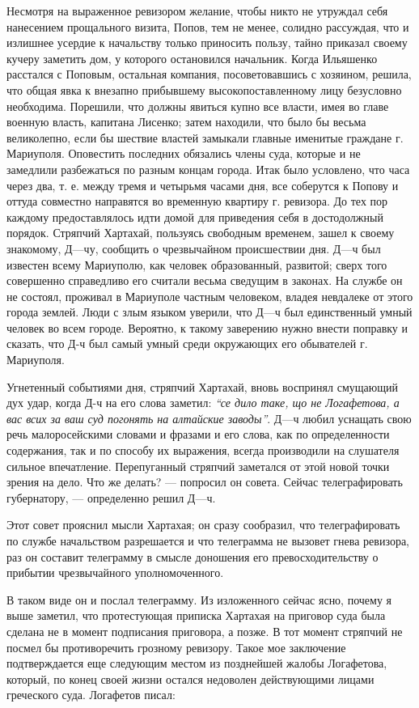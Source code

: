 \documentclass[a4paper,20pt]{report}
\begin{document}
Несмотря на выраженное ревизором желание, чтобы
никто не утруждал себя нанесением прощального визита,
Попов, тем не менее, солидно рассуждая, что и излишнее
усердие к начальству только приносить пользу, тайно приказал 
своему кучеру заметить дом, у которого остановился
начальник. Когда Ильяшенко расстался с Поповым, остальная компания, 
посоветовавшись с хозяином, решила, что
общая явка к внезапно прибывшему высокопоставленному
лицу безусловно необходима. Порешили, что должны явиться
купно все власти, имея во главе военную власть, капитана
Лисенко; затем находили, что было бы весьма великолепно,
если бы шествие властей замыкали главные именитые
граждане г. Мариуполя. Оповестить последних обязались
члены суда, которые и не замедлили разбежаться по разным концам города. Итак
было условлено, что часа через два, т. е. между тремя и четырьмя часами дня,
все соберутся к Попову и оттуда совместно направятся во временную квартиру г.
ревизора. До тех пор каждому предоставлялось идти домой
для приведения себя в достодолжный порядок. Стряпчий Хартахай, пользуясь
свободным временем, зашел к своему знакомому, Д—чу, сообщить о чрезвычайном
происшествии дня. Д—ч был известен всему Мариуполю, как человек образованный,
развитой; сверх того совершенно справедливо его считали весьма сведущим в
законах.  На службе он не состоял, проживал в Мариуполе частным человеком,
владея невдалеке от этого города землей. Люди с злым языком уверили, что Д—ч
был единственный умный человек во всем городе. Вероятно, к такому заверению
нужно внести поправку и сказать, что Д-ч был самый умный среди окружающих его
обывателей г. Мариуполя.

Угнетенный событиями дня, стряпчий Хартахай, вновь воспринял смущающий дух
удар, когда Д-ч на его слова заметил: \emph{``се дило таке, що не Логафетова, а
вас всих за ваш суд погонять на алтайские заводы''}. Д—ч любил уснащать свою
речь малоросейскими словами и фразами и его слова, как по определенности
содержания, так и по способу их выражения, всегда производили на слушателя
сильное впечатление.  Перепуганный стряпчий заметался от этой новой точки
зрения на дело. Что же делать? — попросил он совета. Сейчас телеграфировать
губернатору, — определенно решил Д—ч.

Этот совет прояснил мысли Хартахая; он сразу
сообразил, что телеграфировать по службе начальством
разрешается и что телеграмма не вызовет гнева ревизора,
раз он составит телеграмму в смысле доношения его превосходительству о прибытии чрезвычайного
уполномоченного.
 
В таком виде он и послал телеграмму. Из изложенного сейчас ясно, почему я выше
заметил, что протестующая приписка Хартахая на приговор суда была сделана не в
момент подписания приговора, а позже. В тот момент стряпчий не посмел бы
противоречить грозному ревизору. Такое мое заключение подтверждается еще
следующим местом из позднейшей жалобы Логафетова, который, по конец своей жизни
остался недоволен действующими лицами греческого суда.
Логафетов писал: 
\end{document}
